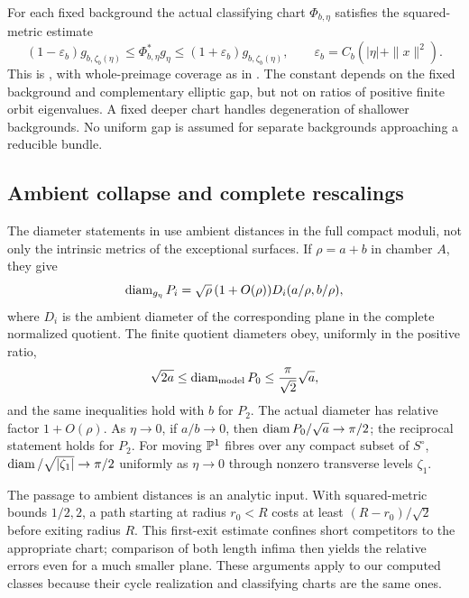 For each fixed background the actual classifying chart
$\Phi_{b,\eta}$ satisfies the squared-metric estimate
\begin{equation}\label{eq:relative-metric}
 (1-\varepsilon_b)g_{b,\zeta_b(\eta)}
 \le\Phi_{b,\eta}^*g_\eta
 \le(1+\varepsilon_b)g_{b,\zeta_b(\eta)},\qquad
 \varepsilon_b=C_b(|\eta|+\|x\|^2).
\end{equation}
This is \cite[Corollary~2.2]{wuebben17}, with whole-preimage
coverage as in \cite[Proposition~5.1]{wuebben18}. The
constant depends on the fixed background and complementary
elliptic gap, but not on ratios of positive finite orbit
eigenvalues. A fixed deeper chart handles degeneration of
shallower backgrounds. No uniform gap is assumed for
separate backgrounds approaching a reducible bundle.

\subsection{Ambient collapse and complete rescalings}
The diameter statements in \cite[\S8]{wuebben17} use
ambient distances in the full compact moduli, not only
the intrinsic metrics of the exceptional surfaces. If
$\rho=a+b$ in chamber $A$, they give
\begin{equation}\label{eq:diameters}
 \operatorname{diam}_{g_\eta}P_i=\sqrt\rho\,(1+O(\rho))
                  D_i(a/\rho,b/\rho),
\end{equation}
where $D_i$ is the ambient diameter of the corresponding
plane in the complete normalized quotient. The finite
quotient diameters obey, uniformly in the positive ratio,
\[
 \sqrt{2a}\le\operatorname{diam}_{\mathrm{model}}P_0
          \le\frac{\pi}{\sqrt2}\sqrt a,
\]
and the same inequalities hold with $b$ for $P_2$.
The actual diameter has relative factor $1+O(\rho)$.
As $\eta\to0$, if $a/b\to0$, then $\operatorname{diam} P_0/\sqrt a\to\pi/2$;
the reciprocal statement holds for $P_2$.
For moving $\mathbb P^1$ fibres over any compact subset of
$S^\circ$, $\operatorname{diam}/\sqrt{|\zeta_1|}\to\pi/2$ uniformly as
$\eta\to0$ through nonzero transverse levels $\zeta_1$.

The passage to ambient distances is an analytic input.
With squared-metric bounds $1/2,2$, a path starting at
radius $r_0<R$ costs at least $(R-r_0)/\sqrt2$ before
exiting radius $R$. This first-exit estimate confines
short competitors to the appropriate chart; comparison
of both length infima then yields the relative errors
even for a much smaller plane. These arguments apply
to our computed classes because their cycle realization
and classifying charts are the same ones.

